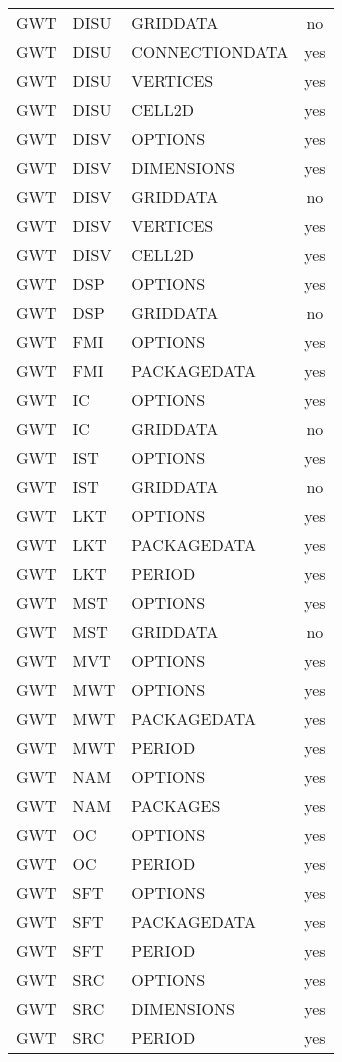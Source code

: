\begin{longtable}{p{1.5cm} p{1.5cm} p{3cm} c}
GWT & DISU & GRIDDATA & no \\ 
GWT & DISU & CONNECTIONDATA & yes \\ 
GWT & DISU & VERTICES & yes \\ 
GWT & DISU & CELL2D & yes \\ 
\hline
GWT & DISV & OPTIONS & yes \\ 
GWT & DISV & DIMENSIONS & yes \\ 
GWT & DISV & GRIDDATA & no \\ 
GWT & DISV & VERTICES & yes \\ 
GWT & DISV & CELL2D & yes \\ 
\hline
GWT & DSP & OPTIONS & yes \\ 
GWT & DSP & GRIDDATA & no \\ 
\hline
GWT & FMI & OPTIONS & yes \\ 
GWT & FMI & PACKAGEDATA & yes \\ 
\hline
GWT & IC & OPTIONS & yes \\ 
GWT & IC & GRIDDATA & no \\ 
\hline
GWT & IST & OPTIONS & yes \\ 
GWT & IST & GRIDDATA & no \\ 
\hline
GWT & LKT & OPTIONS & yes \\ 
GWT & LKT & PACKAGEDATA & yes \\ 
GWT & LKT & PERIOD & yes \\ 
\hline
GWT & MST & OPTIONS & yes \\ 
GWT & MST & GRIDDATA & no \\ 
\hline
GWT & MVT & OPTIONS & yes \\ 
\hline
GWT & MWT & OPTIONS & yes \\ 
GWT & MWT & PACKAGEDATA & yes \\ 
GWT & MWT & PERIOD & yes \\ 
\hline
GWT & NAM & OPTIONS & yes \\ 
GWT & NAM & PACKAGES & yes \\ 
\hline
GWT & OC & OPTIONS & yes \\ 
GWT & OC & PERIOD & yes \\ 
\hline
GWT & SFT & OPTIONS & yes \\ 
GWT & SFT & PACKAGEDATA & yes \\ 
GWT & SFT & PERIOD & yes \\ 
\hline
GWT & SRC & OPTIONS & yes \\ 
GWT & SRC & DIMENSIONS & yes \\ 
GWT & SRC & PERIOD & yes \\ 

\end{longtable}
